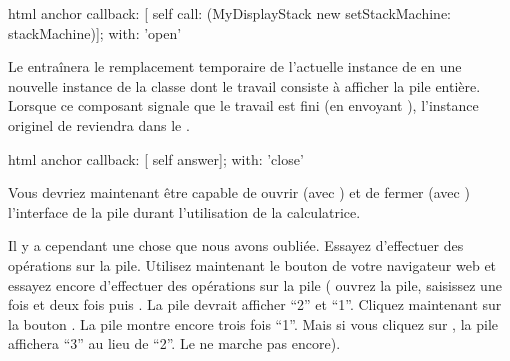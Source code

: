 \documentclass[a4paper,10pt,twoside]{book}
\begin{document}

\begin{code}{}
html anchor
	callback: [ self call: (MyDisplayStack new setStackMachine: stackMachine)];
	with: 'open'
\end{code}

Le \callback{} entraînera le remplacement temporaire de l'actuelle
instance de  en une nouvelle instance de la classe
 dont le travail consiste à afficher la pile
entière.
Lorsque ce composant signale que le travail est fini (en envoyant
), l'instance originel de  reviendra
dans le .



\begin{code}{}
html anchor
	callback: [ self answer];
	with: 'close'
\end{code}

Vous devriez maintenant être capable de ouvrir (avec ) et de
fermer (avec ) l'interface  de la pile durant
l'utilisation de la calculatrice.

Il y a cependant une chose que nous avons oubliée.
Essayez d'effectuer des opérations sur la pile.
Utilisez maintenant le bouton \backbtn{} de votre navigateur web et
essayez encore d'effectuer des opérations sur la pile (\parex
ouvrez la pile, saisissez  une fois et  deux fois
puis \menu{+}. La pile devrait afficher ``2'' et ``1''. Cliquez
maintenant sur la bouton \backbtn. La pile montre encore trois fois
``1''. Mais si vous cliquez sur \menu{+}, la pile affichera ``3''
au lieu de ``2''. Le \backtracking{} ne marche pas encore).
\end{document}
